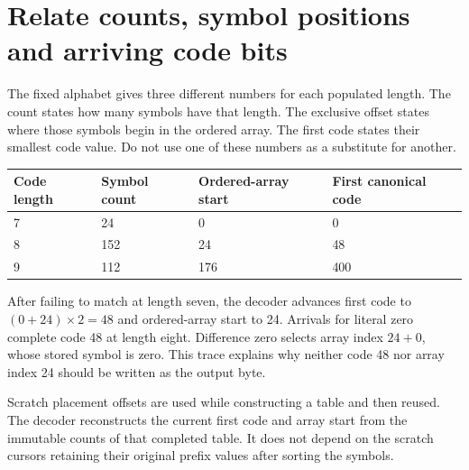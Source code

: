 \section{Relate counts, symbol positions and arriving code bits}
The fixed alphabet gives three different numbers for each populated length. The count
states how many symbols have that length. The exclusive offset states where those
symbols begin in the ordered array. The first code states their smallest code value.
Do not use one of these numbers as a substitute for another.

\begin{longtable}{p{24mm}p{30mm}p{36mm}p{47mm}}
\toprule Code length & Symbol count & Ordered-array start & First canonical code \\\midrule
7 & 24 & 0 & 0 \\
8 & 152 & 24 & 48 \\
9 & 112 & 176 & 400 \\\bottomrule
\end{longtable}
After failing to match at length seven, the decoder advances first code to
$(0+24)\times2=48$ and ordered-array start to 24. Arrivals for literal zero complete
code 48 at length eight. Difference zero selects array index $24+0$, whose stored
symbol is zero. This trace explains why neither code 48 nor array index 24 should be
written as the output byte.

Scratch placement offsets are used while constructing a table and then reused.
The decoder reconstructs the current first code and array start from the immutable
counts of that completed table. It does not depend on the scratch cursors retaining
their original prefix values after sorting the symbols.

